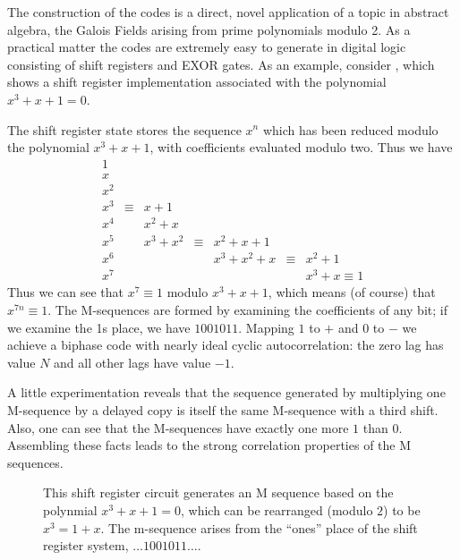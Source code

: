 The construction of the codes is a direct, novel application of a
topic in abstract algebra, the Galois Fields arising from prime
polynomials modulo 2.  As a practical matter the codes are extremely
easy to generate in digital logic consisting of shift registers and
EXOR gates.  As an example, consider , which shows a
shift register implementation associated with the polynomial $x^3 + x
+ 1 = 0$.

The shift register state stores the sequence $x^n$ which has been
reduced modulo the polynomial $x^3 + x + 1$, with coefficients
evaluated modulo two.  Thus we have
\begin{equation}
\begin{array}{lclclcl}
1 \\
x \\
x^2 \\
x^3 &\equiv& x+1 \\
x^4 &      & x^2 + x \\
x^5 &      & x^3 + x^2 &\equiv& x^2 + x + 1 \\
x^6 &      &           &      & x^3 + x^2 + x &\equiv&x^2 + 1 \\
x^7 &      &           &      &               &  &x^3 + x \equiv 1
\end{array}
\end{equation}
Thus we can see that $x^7 \equiv 1$ modulo $x^3 + x + 1$, which means
(of course) that $x^{7n} \equiv 1$.  The M-sequences are formed by
examining the coefficients of any bit; if we examine the 1s place, we
have $1001011$.  Mapping $1$ to $+$ and $0$ to $-$ we achieve a
biphase code with nearly ideal cyclic autocorrelation: the zero lag
has value $N$ and all other lags have value $-1$.

A little experimentation reveals that the sequence generated by
multiplying one M-sequence by a delayed copy is itself the same
M-sequence with a third shift.  Also, one can see that the M-sequences
have exactly one more $1$ than $0$.  Assembling these facts leads to
the strong correlation properties of the M sequences.

\begin{figure}
\centerline{\textwidth {}}
\caption{\label{f:mseq1} This shift register circuit generates an M
sequence based on the polynmial $x^3 + x + 1 = 0$, which can be
rearranged (modulo $2$) to be $x^3 = 1 + x$.  The m-sequence arises
from the ``ones'' place of the shift register system, $\ldots 1001011\ldots$.}
\end{figure}

